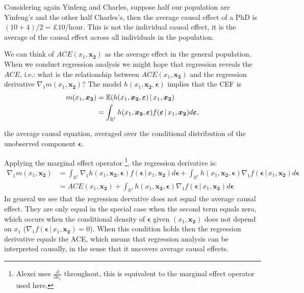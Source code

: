 \documentclass[DIV=14,titlepage=false]{scrreprt}
\begin{document}
\begin{example}
Considering again Yinfeng and Charles, suppose half our population are Yinfeng's and the other half Charles's, then the average causal effect of a PhD is $(10+4)/2=$£$10$/hour. This is not the individual causal effect, it is the average of the causal effect across all individuals in the population.
\end{example}
We can think of $ACE(x_1, \mathbf{x_2})$ as the average effect in the general population. When we conduct regression analysis we might hope that regression reveals the $ACE$, i.e.: what is the relationship between $ACE(x_1, \mathbf{x_2})$ and the regression derivative $\nabla_1 m(x_1, \mathbf{x_2})$? The model $h(x_1, \mathbf{x_2},\boldsymbol{\epsilon})$ implies that the CEF is
\begin{align*}
m(x_1, \boldsymbol{x_2}) &= \mathbb{E}(h(x_1, \boldsymbol{x_2}, \boldsymbol{\varepsilon}) \, | \, x_1, \boldsymbol{x_2})\\
&= \int_{\mathbb{R}^{\ell}} h(x_1, \boldsymbol{x_2}, \boldsymbol{\varepsilon}) f(\boldsymbol{\varepsilon} \, | \, x_1, \boldsymbol{x_2}) d\boldsymbol{\varepsilon},
\end{align*}

the average causal equation, averaged over the conditional distribution of the unobserved component $\boldsymbol{\epsilon}$. 

Applying the marginal effect operator \footnote[1]{Alexei uses $\frac{\partial}{\partial x_1}$ throughout, this is equivalent to the marginal effect operator used here.}, the regression derivative is:
\begin{align*}
\nabla_1 m(x_1, \boldsymbol{x_2}) &= \int_{\mathbb{R}^{\ell}} \nabla_1 h(x_1, \boldsymbol{x_2}, \boldsymbol{\epsilon}) f(\boldsymbol{\epsilon} \, | \, x_1, \boldsymbol{x_2}) d\boldsymbol{\epsilon} + \int_{\mathbb{R}^{\ell}} h(x_1, \boldsymbol{x_2}, \boldsymbol{\epsilon}) \nabla_1 f(\boldsymbol{\epsilon} \, | \, x_1, \boldsymbol{x_2}) d\boldsymbol{\epsilon}\\
&= ACE(x_1, \boldsymbol{x_2}) + \int_{\mathbb{R}^{\ell}} h(x_1, \boldsymbol{x_2}, \boldsymbol{\epsilon}) \nabla_1 f(\boldsymbol{\epsilon} \, | \, x_1, \boldsymbol{x_2}) d\boldsymbol{\epsilon}
\end{align*}
In general we see that the regression dervative does not equal the average causal effect. They are only equal in the special case when the second term equals zero, which occurs when the conditional density of $\boldsymbol{\epsilon}$ given $( x_1, \boldsymbol{x_2})$ does not depend on $x_1$ ($\nabla_1 f(\boldsymbol{\epsilon} \, | \, x_1, \boldsymbol{x_2})=0$). When this condition holds then the regression derivative equals the ACE, which means that regression analysis can be interpreted causally, in the sense that it uncovers average causal effects.\\
\end{document}
